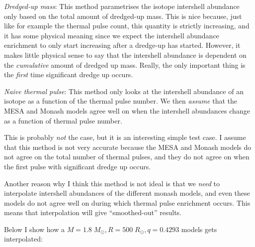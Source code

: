 \documentclass[a4paper,10pt]{article}
\begin{document}
\begin{enumd}
    \item  \emph{Dredged-up mass}: This method parametrises the isotope intershell abundance only based on the total amount of dredged-up mass. This is nice because, just like for example the thermal pulse count, this quantity is strictly increasing, and it has some physical meaning since we expect the intershell abundance enrichment to only start increasing after a dredge-up has started. However, it makes little physical sense to say that the intershell abundance is dependent on the \emph{cumulative} amount of dredged up mass. Really, the only important thing is the \emph{first} time significant dredge up occurs.

    \begin{figure}[ht]
        \centering
    \end{figure}
    
    \item \emph{Naive thermal pulse}: This method only looks at the intershell abundance of an isotope as a function of the thermal pulse number. We then \emph{assume} that the MESA and Monash models agree well on when the intershell abundances change as a function of thermal pulse number.

        This is probably \emph{not} the case, but it is an interesting simple test case. I assume that this method is not very accurate because the MESA and Monash models do not agree on the total number of thermal pulses, and they do not agree on when the first pulse with significant dredge up occurs.

        Another reason why I think this method is not ideal is that we \emph{need} to interpolate intershell abundances of the different monash models, and even these models do not agree well on during which thermal pulse enrichment occurs. This means that interpolation will give ``smoothed-out'' results. 
        
        Below I show how a \(M=1.8\;M_\odot, R=500\;R_\odot , q=0.4293\) models gets interpolated:


\end{enumd}
\end{document}

